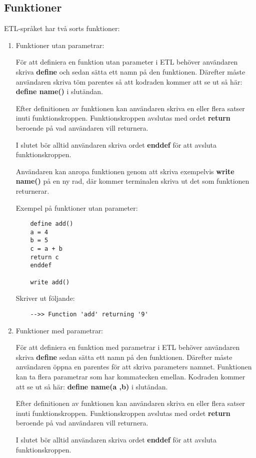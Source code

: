 \documentclass{TDP019mall}
\begin{document}
\subsection{Funktioner}
ETL-språket har två sorts funktioner:
\begin{enumerate}
\item Funktioner utan parametrar:

För att definiera en funktion utan parameter i ETL behöver användaren skriva \textbf{define} och sedan sätta ett namn på den funktionen. 
Därefter måste användaren skriva töm parentes så att kodraden kommer att se ut så här: \textbf{define name()} i slutändan.
 
Efter definitionen av funktionen kan användaren skriva en eller flera satser inuti funktionskroppen. Funktionskroppen avslutas med 
ordet \textbf{return} beroende på vad användaren vill returnera.
 
I slutet bör alltid användaren skriva ordet \textbf{enddef} för att avsluta funktionskroppen. 
 
Användaren kan anropa funktionen genom att skriva exempelvis \textbf{write name()} på en ny rad, där kommer terminalen skriva 
ut det som funktionen returnerar.  

\newpage
Exempel på funktioner utan parameter:
\begin{verbatim}
    define add()
    a = 4
    b = 5
    c = a + b
    return c
    enddef

    write add()
\end{verbatim}
 
Skriver ut följande:
\begin{verbatim}
    -->> Function 'add' returning '9'
\end{verbatim}

 
\item Funktioner med parametrar:

För att definiera en funktion med parametrar i ETL behöver användaren skriva \textbf{define} sedan sätta ett namn på den funktionen. 
Därefter måste användaren öppna en parentes för att skriva parameters namnet. Funktionen kan ta flera parametrar som har kommatecken emellan. 
Kodraden kommer att se ut så här: \textbf{define name(a ,b)} i slutändan.
 
Efter definitionen av funktionen kan användaren skriva en eller flera satser inuti funktionskroppen. Funktionskroppen avslutas med 
ordet \textbf{return} beroende på vad användaren vill returnera.
 
I slutet bör alltid användaren skriva ordet \textbf{enddef} för att avsluta funktionskroppen. 
 

\end{enumerate}
\end{document}
